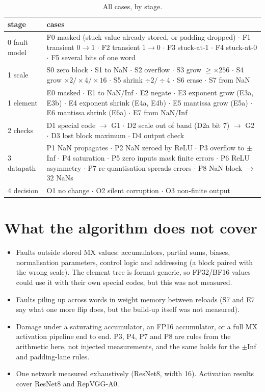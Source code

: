 \documentclass[10pt,a4paper]{article}
\begin{document}
\begin{table}[h]
\centering
\caption{All cases, by stage.}
\begin{tabularx}{\linewidth}{lX}
\toprule
stage & cases \\
\midrule
0 fault model & F0 masked (stuck value already stored, or padding dropped) $\cdot$ F1 transient $0\to1$
  $\cdot$ F2 transient $1\to0$ $\cdot$ F3 stuck-at-1 $\cdot$ F4 stuck-at-0 $\cdot$ F5 several bits of one word \\
1 scale & S0 zero block $\cdot$ S1 to NaN $\cdot$ S2 overflow $\cdot$ S3 grow $\ge\times256$ $\cdot$
  S4 grow $\times2/\times4/\times16$ $\cdot$ S5 shrink $\div2/\div4$ $\cdot$ S6 erase $\cdot$ S7 from NaN \\
1 element & E0 masked $\cdot$ E1 to NaN/Inf $\cdot$ E2 negate $\cdot$ E3 exponent grow (E3a, E3b) $\cdot$
  E4 exponent shrink (E4a, E4b) $\cdot$ E5 mantissa grow (E5a) $\cdot$ E6 mantissa shrink (E6a) $\cdot$ E7 from NaN/Inf \\
2 checks & D1 special code $\to$ G1 $\cdot$ D2 scale out of band (D2a bit 7) $\to$ G2 $\cdot$ D3 lost block maximum $\cdot$ D4 output check \\
3 datapath & P1 NaN propagates $\cdot$ P2 NaN zeroed by ReLU $\cdot$ P3 overflow to $\pm$Inf $\cdot$
  P4 saturation $\cdot$ P5 zero inputs mask finite errors $\cdot$ P6 ReLU asymmetry $\cdot$
  P7 re-quantisation spreads errors $\cdot$ P8 NaN block $\to$ 32 NaNs \\
4 decision & O1 no change $\cdot$ O2 silent corruption $\cdot$ O3 non-finite output \\
\bottomrule
\end{tabularx}
\end{table}

\section{What the algorithm does not cover}

\begin{itemize}
  \item Faults outside stored MX values: accumulators, partial sums, biases, normalisation
        parameters, control logic and addressing (a block paired with the wrong scale). The
        element tree is format-generic, so FP32/BF16 values could use it with their own special
        codes, but this was not measured.
  \item Faults piling up across words in weight memory between reloads (S7 and E7 say what one
        more flip does, but the build-up itself was not measured).
  \item Damage under a saturating accumulator, an FP16 accumulator, or a full MX activation
        pipeline end to end. P3, P4, P7 and P8 are rules from the arithmetic here, not injected
        measurements, and the same holds for the $\pm$Inf and padding-lane rules.
  \item One network measured exhaustively (ResNet8, width 16). Activation results cover ResNet8
        and RepVGG-A0.
\end{itemize}
\end{document}
